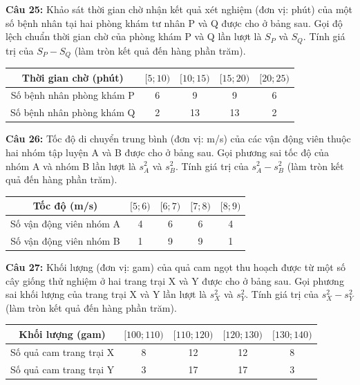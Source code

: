 \documentclass[12pt]{article}
\begin{document}
	\vspace{4mm}
	
	\noindent \textbf{Câu 25:} Khảo sát thời gian chờ nhận kết quả xét nghiệm (đơn vị: phút) của một số bệnh nhân tại hai phòng khám tư nhân P và Q được cho ở bảng sau. Gọi độ lệch chuẩn thời gian chờ của phòng khám P và Q lần lượt là $S_P$ và $S_Q$. Tính giá trị của $S_P - S_Q$ (làm tròn kết quả đến hàng phần trăm).
	\begin{center}
		\renewcommand{\arraystretch}{1.3}
		\begin{tabular}{|c|c|c|c|c|}
			\hline
			Thời gian chờ (phút) & $[5; 10)$ & $[10; 15)$ & $[15; 20)$ & $[20; 25)$ \\
			\hline
			Số bệnh nhân phòng khám P & 6 & 9 & 9 & 6 \\
			\hline
			Số bệnh nhân phòng khám Q & 2 & 13 & 13 & 2 \\
			\hline
		\end{tabular}
	\end{center}
	
	\vspace{4mm}
	
	\noindent \textbf{Câu 26:} Tốc độ di chuyển trung bình (đơn vị: m/s) của các vận động viên thuộc hai nhóm tập luyện A và B được cho ở bảng sau. Gọi phương sai tốc độ của nhóm A và nhóm B lần lượt là $s_A^2$ và $s_B^2$. Tính giá trị của $s_A^2 - s_B^2$ (làm tròn kết quả đến hàng phần trăm).
	\begin{center}
		\renewcommand{\arraystretch}{1.3}
		\begin{tabular}{|c|c|c|c|c|}
			\hline
			Tốc độ (m/s) & $[5; 6)$ & $[6; 7)$ & $[7; 8)$ & $[8; 9)$ \\
			\hline
			Số vận động viên nhóm A & 4 & 6 & 6 & 4 \\
			\hline
			Số vận động viên nhóm B & 1 & 9 & 9 & 1 \\
			\hline
		\end{tabular}
	\end{center}
	
	\vspace{4mm}
	
	\noindent \textbf{Câu 27:} Khối lượng (đơn vị: gam) của quả cam ngọt thu hoạch được từ một số cây giống thử nghiệm ở hai trang trại X và Y được cho ở bảng sau. Gọi phương sai khối lượng của trang trại X và Y lần lượt là $s_X^2$ và $s_Y^2$. Tính giá trị của $s_X^2 - s_Y^2$ (làm tròn kết quả đến hàng phần trăm).
	\begin{center}
		\renewcommand{\arraystretch}{1.3}
		\begin{tabular}{|c|c|c|c|c|}
			\hline
			Khối lượng (gam) & $[100; 110)$ & $[110; 120)$ & $[120; 130)$ & $[130; 140)$ \\
			\hline
			Số quả cam trang trại X & 8 & 12 & 12 & 8 \\
			\hline
			Số quả cam trang trại Y & 3 & 17 & 17 & 3 \\
			\hline
		\end{tabular}
	\end{center}
	
\end{document}
